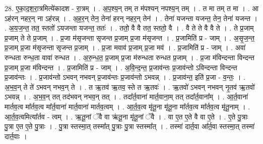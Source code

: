 \documentclass[17pt]{extarticle}
\begin{document}
28. ए॒का॒द॒श॒रा॒त्रमित्ये॑कादश - रा॒त्रम् । . अ॒प॒श्य॒न् तम् त म॑पश्यन् नपश्य॒न् तम् । . त मा तम् त मा । . आ ऽह॑रन् नहर॒न् ना ऽह॑रन्न् । . अ॒ह॒र॒न् तेन॒ तेना॑ हरन् नहर॒न् तेन॑ । . तेना॑ यजन्ता यजन्त॒ तेन॒ तेना॑ यजन्त । . अ॒य॒ज॒न्त॒ तत॒ स्ततो॑ ऽयजन्ता यजन्त॒ ततः॑ । . ततो॒ वै वै तत॒ स्ततो॒ वै । . वै ते ते वै वै ते । . ते प्र॒जाम् प्र॒जाम् ते ते प्र॒जाम् । . प्र॒जा म॑सृजन्ता सृजन्त प्र॒जाम् प्र॒जा म॑सृजन्त । . प्र॒जामिति॑ प्र - जाम् । . अ॒सृ॒ज॒न्त॒ प्र॒जाम् प्र॒जा म॑सृजन्ता सृजन्त प्र॒जाम् । . प्र॒जा मवाव॑ प्र॒जाम् प्र॒जा मव॑ । . प्र॒जामिति॑ प्र - जाम् । . अवा॑ रुन्धता रुन्ध॒ता वावा॑ रुन्धत । . अ॒रु॒न्ध॒त॒ प्र॒जाम् प्र॒जा म॑रुन्धता रुन्धत प्र॒जाम् । . प्र॒जा म॑विन्दन्ता विन्दन्त प्र॒जाम् प्र॒जा म॑विन्दन्त । . प्र॒जामिति॑ प्र - जाम् । . अ॒वि॒न्द॒न्त॒ प्र॒जाव॑न्तः प्र॒जाव॑न्तो ऽविन्दन्ता विन्दन्त प्र॒जाव॑न्तः । . प्र॒जाव॑न्तो ऽभवन् नभवन् प्र॒जाव॑न्तः प्र॒जाव॑न्तो ऽभवन्न् । . प्र॒जाव॑न्त॒ इति॑ प्र॒जा - व॒न्तः॒ । . अ॒भ॒व॒न् ते ते॑ ऽभवन् नभव॒न् ते । . त ऋ॒तव॑ ऋ॒तव॒ स्ते त ऋ॒तवः॑ । . ऋ॒तवो॑ ऽभवन् नभवन् नृ॒तव॑ ऋ॒तवो॑ ऽभवन्न् । . अ॒भ॒व॒न् तत् तद॑भवन् नभव॒न् तत् । . तदा᳚र्त॒वाना॑ मार्त॒वाना॒म् तत् तदा᳚र्त॒वाना᳚म् । . आ॒र्त॒वाना॑ मार्तव॒त्व मा᳚र्तव॒त्व मा᳚र्त॒वाना॑ मार्त॒वाना॑ मार्तव॒त्वम् । . आ॒र्त॒व॒त्व मृ॑तू॒ना मृ॑तू॒ना मा᳚र्तव॒त्व मा᳚र्तव॒त्व मृ॑तू॒नाम् । . आ॒र्त॒व॒त्वमित्या᳚र्तव - त्वम् । . ऋ॒तू॒नां ॅवै वा ऋ॑तू॒ना मृ॑तू॒नां ॅवै । . वा ए॒त ए॒ते वै वा ए॒ते । . ए॒ते पु॒त्राः पु॒त्रा ए॒त ए॒ते पु॒त्राः । . पु॒त्रा स्तस्मा॒त् तस्मा᳚त् पु॒त्राः पु॒त्रा स्तस्मा᳚त् । . तस्मा॑ दार्त॒वा आ᳚र्त॒वा स्तस्मा॒त् तस्मा॑ दार्त॒वाः । \newline
\end{document}
